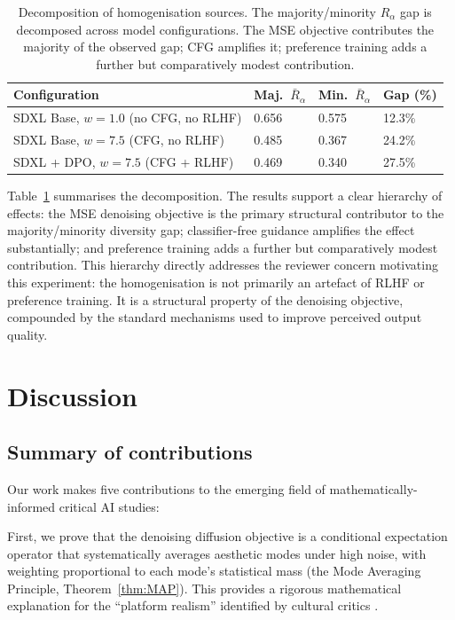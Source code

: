 \documentclass[11pt]{article}
\begin{document}
\begin{table}[t]
\centering
\caption{Decomposition of homogenisation sources. The majority/minority $R_\alpha$ gap is decomposed across model configurations. The MSE objective contributes the majority of the observed gap; CFG amplifies it; preference training adds a further but comparatively modest contribution.}
\label{tab:ablation_summary}
\begin{tabular}{@{}llll@{}}
\toprule
\textbf{Configuration} & \textbf{Maj.\ $\bar{R}_\alpha$} & \textbf{Min.\ $\bar{R}_\alpha$} & \textbf{Gap (\%)} \\
\midrule
SDXL Base, $w = 1.0$ (no CFG, no RLHF) & 0.656 & 0.575 & 12.3\% \\
SDXL Base, $w = 7.5$ (CFG, no RLHF) & 0.485 & 0.367 & 24.2\% \\
SDXL + DPO, $w = 7.5$ (CFG + RLHF) & 0.469 & 0.340 & 27.5\% \\
\bottomrule
\end{tabular}
\end{table}

Table~\ref{tab:ablation_summary} summarises the decomposition. The results support a clear hierarchy of effects: the MSE denoising objective is the primary structural contributor to the majority/minority diversity gap; classifier-free guidance amplifies the effect substantially; and preference training adds a further but comparatively modest contribution. This hierarchy directly addresses the reviewer concern motivating this experiment: the homogenisation is not primarily an artefact of RLHF or preference training. It is a structural property of the denoising objective, compounded by the standard mechanisms used to improve perceived output quality.

\section{Discussion}\label{sec:discussion}

\subsection{Summary of contributions}

Our work makes five contributions to the emerging field of mathematically-informed critical AI studies:

First, we prove that the denoising diffusion objective is a conditional expectation operator that systematically averages aesthetic modes under high noise, with weighting proportional to each mode's statistical mass (the Mode Averaging Principle, Theorem~\ref{thm:MAP}). This provides a rigorous mathematical explanation for the ``platform realism'' identified by cultural critics \citep{Meyer2025}.
\end{document}
